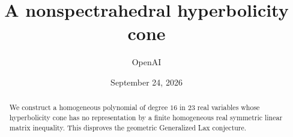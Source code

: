 \documentclass[11pt]{article}
\title{A nonspectrahedral hyperbolicity cone}
\author{OpenAI}
\date{September 24, 2026}
\theoremstyle{remark}
\numberwithin{equation}{section}
\begin{document}
\maketitle
\begin{abstract}
We construct a homogeneous polynomial of degree $16$ in $23$ real variables
whose hyperbolicity cone has no representation by a finite homogeneous
real symmetric linear matrix inequality. This disproves the geometric Generalized Lax
conjecture.
\end{abstract}
\tableofcontents







\appendix



\end{document}
